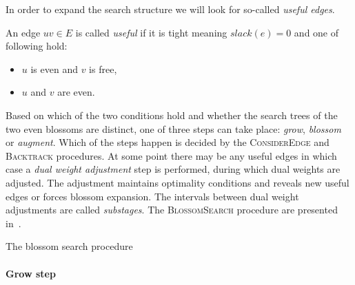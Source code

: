 In order to expand the search structure we will look for so-called \emph{useful edges}.

\begin{defn}
    An edge $uv \in E$ is called \emph{useful} if it is tight meaning $slack(e) = 0$ and one of following hold:

    \begin{itemize}
        \item $u$ is even and $v$ is free,
        \item $u$ and $v$ are even.
    \end{itemize}
\end{defn}

Based on which of the two conditions hold and whether the search trees of the two even blossoms are distinct, one of three steps can take place: \emph{grow}, \emph{blossom} or \emph{augment}. Which of the steps happen is decided by the \textsc{ConsiderEdge} and \textsc{Backtrack} procedures. At some point there may be any useful edges in which case a \emph{dual weight adjustment} step is performed, during which dual weights are adjusted. The adjustment maintains optimality conditions and reveals new useful edges or forces blossom expansion. The intervals between dual weight adjustments are called \emph{substages}. The \textsc{BlossomSearch} procedure are presented in~.

\begin{algorithm}
\caption{The blossom search procedure}\label{alg:blossom_search}
\begin{algorithmic}[1]
    \Else
    \EndIf
\EndFor
\State
{}
    \EndWhile
\EndWhile
\EndProcedure
\State
{}
\Else{}
\EndIf
\EndProcedure
\end{algorithmic}
\end{algorithm}

\paragraph*{Grow step}

